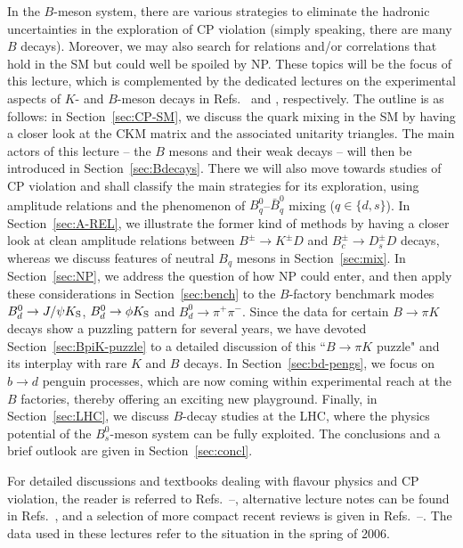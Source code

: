 \documentclass[12pt]{article}
\begin{document}
In the $B$-meson system, there are various strategies to eliminate
the hadronic uncertainties in the exploration of CP violation (simply
speaking, there are many $B$ decays). Moreover, we may also search
for relations and/or correlations that hold in the SM but could well be
spoiled by NP. These topics will be the focus of this lecture, which is
complemented by the dedicated lectures on the experimental aspects 
of $K$- and $B$-meson decays in Refs.~\cite{jeitler} and \cite{widhalm}, respectively. 
The outline is as follows: in Section~\ref{sec:CP-SM}, we discuss the quark 
mixing in the SM by having a closer look at the CKM matrix and the
associated unitarity triangles. The main actors of this lecture -- the
$B$ mesons and their weak decays -- will then be introduced in 
Section~\ref{sec:Bdecays}. There we will also move towards studies
of CP violation and shall classify the main strategies for its exploration,
using amplitude relations and the phenomenon of $B^0_q$--$\bar B^0_q$ 
mixing ($q\in\{d,s\}$). In Section~\ref{sec:A-REL}, we illustrate the former 
kind of methods by having a closer look at clean amplitude relations between
$B^\pm\to K^\pm D$ and $B_c^\pm\to D_s^\pm D$ decays, whereas we discuss 
features of neutral
$B_q$ mesons in Section~\ref{sec:mix}. In Section~\ref{sec:NP}, we address the question of how NP could enter, and then apply these considerations in 
Section~\ref{sec:bench} to the $B$-factory benchmark modes 
$B^0_d\to J/\psi K_{\rm S}$, $B^0_d\to \phi K_{\rm S}$ and $B^0_d\to\pi^+\pi^-$.
Since the data for certain $B\to\pi K$
decays show a puzzling pattern for several years, we have devoted 
Section~\ref{sec:BpiK-puzzle} to a detailed discussion of this ``$B\to\pi K$
puzzle" and its interplay with rare $K$ and $B$ decays. In Section~\ref{sec:bd-pengs}, 
we focus on $b\to d$ penguin processes, which are now coming within experimental 
reach at the $B$ factories, thereby offering an exciting new playground. Finally, 
in Section~\ref{sec:LHC}, we discuss $B$-decay studies at the  LHC, where the 
physics potential of the $B^0_s$-meson system can be fully exploited. 
The conclusions and a brief outlook are given in Section~\ref{sec:concl}.

For detailed discussions and textbooks dealing with flavour physics and CP violation, 
the reader is referred to Refs.~\cite{BF-rev}--\cite{mannel-book}, alternative lecture 
notes can be found in Refs.~\cite{nir-argentina, buras-spain}, and a selection 
of more compact recent reviews is given in Refs.~\cite{ali-rev}--\cite{HoLi-rev}.
The data used in these lectures refer to the situation in the spring of 2006.
\end{document}
